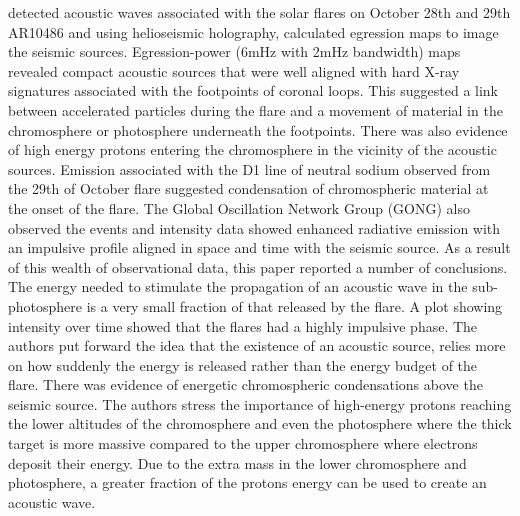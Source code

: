 \documentclass[11pt]{article}
\begin{document}
\cite{2005ApJ...630.1168D} detected acoustic waves associated with the solar flares on October 28th and 29th AR10486 and using helioseismic holography, calculated egression maps to image the seismic sources. Egression-power (6mHz with 2mHz bandwidth) maps revealed compact acoustic sources that were well aligned with hard X-ray signatures associated with the footpoints of coronal loops. This suggested a link between accelerated particles during the flare and a movement of material in the chromosphere or photosphere underneath the footpoints. There was also evidence of high energy protons entering the chromosphere in the vicinity of the acoustic sources. Emission associated with the D1 line of neutral sodium observed from the 29th of October flare suggested condensation of chromospheric material at the onset of the flare. The Global Oscillation Network Group (GONG) also observed the events and intensity data showed enhanced radiative emission with an impulsive profile aligned in space and time with the seismic source. As a result of this wealth of observational data, this paper reported a number of conclusions. The energy needed to stimulate the propagation of an acoustic wave in the sub-photosphere is a very small fraction of that released by the flare. A plot showing intensity over time showed that the flares had a highly impulsive phase. The authors put forward the idea that the existence of an acoustic source, relies more on how suddenly the energy is released rather than the energy budget of the flare. There was evidence of energetic chromospheric condensations above the seismic source. The authors stress the importance of high-energy protons reaching the lower altitudes of the chromosphere and even the photosphere where the thick target is more massive compared to the upper chromosphere where electrons deposit their energy. Due to the extra mass in the lower chromosphere and photosphere, a greater fraction of the protons energy can be used to create an acoustic wave.  \\
\end{document}
